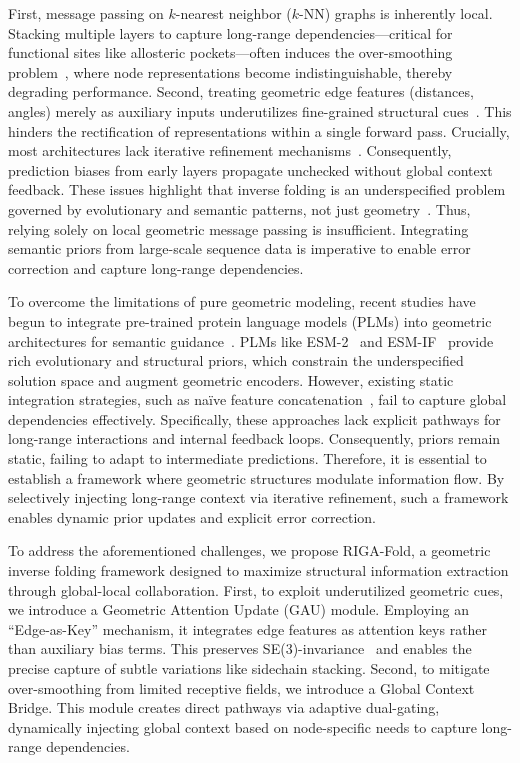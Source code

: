 \documentclass{article}
\theoremstyle{plain}
\theoremstyle{definition}
\theoremstyle{remark}
\begin{document}
First, message passing on $k$-nearest neighbor ($k$-NN) graphs is inherently local. Stacking multiple layers to capture long-range dependencies—critical for functional sites like allosteric pockets—often induces the over-smoothing problem~\cite{li2018deeper, oono2019graph}, where node representations become indistinguishable, thereby degrading performance. Second, treating geometric edge features (distances, angles) merely as auxiliary inputs underutilizes fine-grained structural cues~\cite{jing2021equivariant}. This hinders the rectification of representations within a single forward pass. Crucially, most architectures lack iterative refinement mechanisms~\cite{wang2023lm}. Consequently, prediction biases from early layers propagate unchecked without global context feedback. These issues highlight that inverse folding is an underspecified problem governed by evolutionary and semantic patterns, not just geometry~\cite{yi2023graph}. Thus, relying solely on local geometric message passing is insufficient. Integrating semantic priors from large-scale sequence data is imperative to enable error correction and capture long-range dependencies.

To overcome the limitations of pure geometric modeling, recent studies have begun to integrate pre-trained protein language models (PLMs) into geometric architectures for semantic guidance~\cite{elnaggar2021prottrans, rives2021biological}. PLMs like ESM-2~\cite{lin2023evolutionary} and ESM-IF~\cite{hsu2022learning} provide rich evolutionary and structural priors, which constrain the underspecified solution space and augment geometric encoders. However, existing static integration strategies, such as naïve feature concatenation~\cite{zhang2023survey}, fail to capture global dependencies effectively. Specifically, these approaches lack explicit pathways for long-range interactions and internal feedback loops. Consequently, priors remain static, failing to adapt to intermediate predictions. Therefore, it is essential to establish a framework where geometric structures modulate information flow. By selectively injecting long-range context via iterative refinement, such a framework enables dynamic prior updates and explicit error correction.

To address the aforementioned challenges, we propose RIGA-Fold, a geometric inverse folding framework designed to maximize structural information extraction through global-local collaboration. First, to exploit underutilized geometric cues, we introduce a Geometric Attention Update (GAU) module. Employing an ``Edge-as-Key'' mechanism, it integrates edge features as attention keys rather than auxiliary bias terms. This preserves SE(3)-invariance~\cite{fuchs2020se3} and enables the precise capture of subtle variations like sidechain stacking. Second, to mitigate over-smoothing from limited receptive fields, we introduce a Global Context Bridge. This module creates direct pathways via adaptive dual-gating, dynamically injecting global context based on node-specific needs to capture long-range dependencies.
\end{document}
